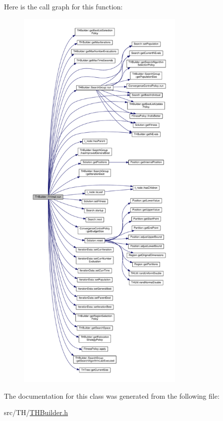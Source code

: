 Here is the call graph for this function\+:
\nopagebreak
\begin{figure}[H]
\begin{center}
\leavevmode
\includegraphics[height=550pt]{classTHBuilder_1_1THImpl_a943301db5154fd7b672119b5c9917303_cgraph}
\end{center}
\end{figure}




The documentation for this class was generated from the following file\+:\begin{DoxyCompactItemize}
\item 
src/\+T\+H/\hyperlink{THBuilder_8h}{T\+H\+Builder.\+h}\end{DoxyCompactItemize}
